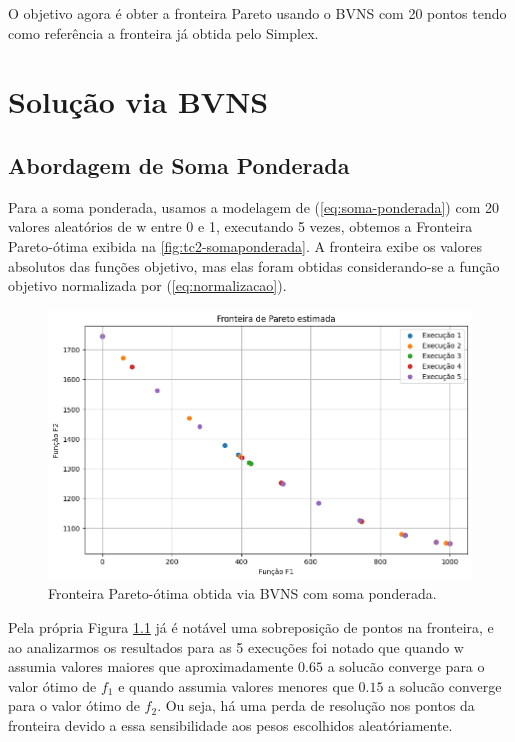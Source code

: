 \documentclass[
	12pt,				%
	oneside,			%
	a4paper,			%
	chapter=TITLE,
	sumario=tradicional,
	english,			%
	brazil				%
]{abntex2}
\begin{document}
O objetivo agora é obter a fronteira Pareto usando o BVNS com 20 pontos
tendo como referência a 
fronteira já obtida pelo Simplex.

\chapter{Solução via BVNS}\label{cap:BVNS} 

\section{Abordagem de Soma Ponderada}

Para a soma ponderada, usamos a modelagem de (\ref{eq:soma-ponderada})
com 20 valores aleatórios de $\mathrm{w}$ entre 0 e 1, 
executando 5 vezes, obtemos a Fronteira Pareto-ótima exibida na 
\autoref{fig:tc2-somaponderada}. A fronteira exibe os valores absolutos das funções objetivo, mas 
elas foram obtidas considerando-se a função objetivo normalizada por (\ref{eq:normalizacao}).

\begin{figure}[h!]
	\caption{\label{fig:tc2-somaponderada}Fronteira Pareto-ótima obtida via BVNS com soma ponderada.}
	\begin{center}
    \includegraphics[width=\textwidth,trim=1 1 1 1,clip]{tc2-somaponderada.png}
	\end{center}
\end{figure}

Pela própria Figura \ref{fig:tc2-somaponderada} já é notável uma sobreposição de pontos na fronteira, e ao analizarmos os resultados para as 5 execuções foi notado que
quando $\mathrm{w}$ assumia valores maiores que aproximadamente $0.65$ a solucão converge para o valor ótimo de $f_1$ e quando assumia valores menores que $0.15$
a solucão converge para o valor ótimo de $f_2$. Ou seja, há uma perda de resolução nos pontos da fronteira devido a essa sensibilidade aos pesos escolhidos aleatóriamente.
\end{document}
